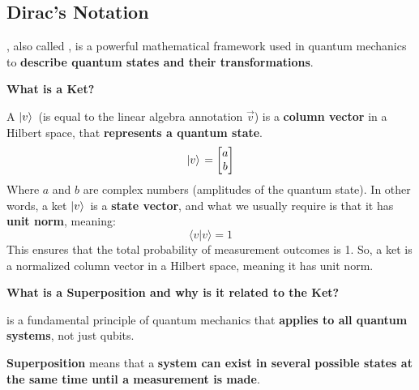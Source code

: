 \subsection{Dirac's Notation}

, also called , is a powerful mathematical framework used in quantum mechanics to \textbf{describe quantum states and their transformations}.

\highspace
\begin{flushleft}
    \textcolor{Green3}{ \textbf{What is a Ket?}}
\end{flushleft}
A  $\left| v \rangle\right.$ (is equal to the linear algebra annotation $\overrightarrow{v}$) is a \textbf{column vector} in a Hilbert space, that \textbf{represents a quantum state}.
\begin{equation*}
    \left| v \rangle\right. = \begin{bmatrix}
        a \\ b
    \end{bmatrix}
\end{equation*}
Where $a$ and $b$ are complex numbers (amplitudes of the quantum state). In other words, a ket $\left| v \rangle\right.$ is a \textbf{state vector}, and what we usually require is that it has \textbf{unit norm}, meaning:
\begin{equation*}
    \langle v | v \rangle = 1
\end{equation*}
This ensures that the total probability of measurement outcomes is 1. So, a ket is a normalized column vector in a Hilbert space, meaning it has unit norm.

\highspace
\begin{flushleft}
    \textcolor{Green3}{ \textbf{What is a Superposition and why is it related to the Ket?}}
\end{flushleft}
 is a fundamental principle of quantum mechanics that \textbf{applies to all quantum systems}, not just qubits.
\begin{definitionbox}[: Superposition]
    \textbf{Superposition} means that a \textbf{system can exist in several possible states at the same time until a measurement is made}.
\end{definitionbox}

